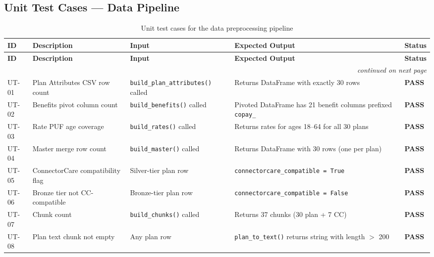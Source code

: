 \documentclass[12pt, letterpaper]{article}
\begin{document}
\subsection{Unit Test Cases --- Data Pipeline}

\begin{longtable}{p{1cm} p{3.8cm} p{3.2cm} p{3.2cm} p{1.5cm}}
  \caption{Unit test cases for the data preprocessing pipeline}
  \label{tab:unit_tests_pipeline} \\
  \toprule
  \textbf{ID} & \textbf{Description} & \textbf{Input} & \textbf{Expected Output} & \textbf{Status} \\
  \midrule
  \endfirsthead
  \toprule
  \textbf{ID} & \textbf{Description} & \textbf{Input} & \textbf{Expected Output} & \textbf{Status} \\
  \midrule
  \endhead
  \midrule \multicolumn{5}{r}{\itshape continued on next page} \\
  \endfoot
  \bottomrule
  \endlastfoot
  UT-01 & Plan Attributes CSV row count & \texttt{build\_plan\_attributes()} called & Returns DataFrame with exactly 30 rows & \textcolor{commentgreen}{\textbf{PASS}} \\[4pt]
  UT-02 & Benefits pivot column count & \texttt{build\_benefits()} called & Pivoted DataFrame has 21 benefit columns prefixed \texttt{copay\_} & \textcolor{commentgreen}{\textbf{PASS}} \\[4pt]
  UT-03 & Rate PUF age coverage & \texttt{build\_rates()} called & Returns rates for ages 18--64 for all 30 plans & \textcolor{commentgreen}{\textbf{PASS}} \\[4pt]
  UT-04 & Master merge row count & \texttt{build\_master()} called & Returns DataFrame with 30 rows (one per plan) & \textcolor{commentgreen}{\textbf{PASS}} \\[4pt]
  UT-05 & ConnectorCare compatibility flag & Silver-tier plan row & \texttt{connectorcare\_compatible = True} & \textcolor{commentgreen}{\textbf{PASS}} \\[4pt]
  UT-06 & Bronze tier not CC-compatible & Bronze-tier plan row & \texttt{connectorcare\_compatible = False} & \textcolor{commentgreen}{\textbf{PASS}} \\[4pt]
  UT-07 & Chunk count & \texttt{build\_chunks()} called & Returns 37 chunks (30 plan + 7 CC) & \textcolor{commentgreen}{\textbf{PASS}} \\[4pt]
  UT-08 & Plan text chunk not empty & Any plan row & \texttt{plan\_to\_text()} returns string with length $>$ 200 & \textcolor{commentgreen}{\textbf{PASS}} \\
\end{longtable}
\end{document}
